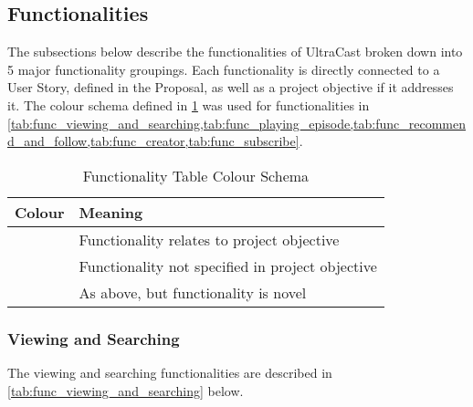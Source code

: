 \documentclass[../report.tex]{subfiles}
\begin{document}
   

\subsection{Functionalities}

The subsections below describe the functionalities of UltraCast broken down into 5
major functionality groupings. Each functionality is directly connected to a User Story,
defined in the Proposal, as well as a project objective if it addresses it. The colour 
schema defined in \cref{tab:func_table_colours} was used for functionalities in  
\cref{tab:func_viewing_and_searching,tab:func_playing_episode,tab:func_recommend_and_follow,tab:func_creator,tab:func_subscribe}.

\begin{longtable}[c]{|l|l|}
  \caption{Functionality Table Colour Schema}
  \label{tab:func_table_colours}\\
  \hline
  \rowcolor[HTML]{E2E2E2} 
  \textbf{Colour} & \textbf{Meaning} \\ \hline
  \endfirsthead
  \endhead
  \cellcolor[HTML]{FFFDD1} & Functionality relates to project objective \\ \hline
  \cellcolor[HTML]{FAFAFA} & Functionality not specified in project objective \\ \hline
  \cellcolor[HTML]{E8FBFF} & As above, but functionality is novel \\ \hline
\end{longtable}

\subsubsection{Viewing and Searching}

The viewing and searching functionalities are described in \cref{tab:func_viewing_and_searching} below.
\end{document}
